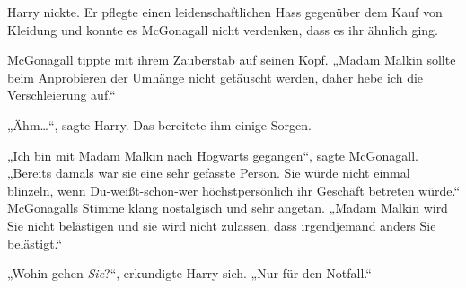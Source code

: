 Harry nickte. Er pflegte einen leidenschaftlichen Hass gegenüber dem Kauf von Kleidung und konnte es McGonagall nicht verdenken, dass es ihr ähnlich ging.

McGonagall tippte mit ihrem Zauberstab auf seinen Kopf. „Madam Malkin sollte beim Anprobieren der Umhänge nicht getäuscht werden, daher hebe ich die Verschleierung auf.“

„Ähm…“, sagte Harry. Das bereitete ihm einige Sorgen.

„Ich bin mit Madam Malkin nach Hogwarts gegangen“, sagte McGonagall. „Bereits damals war sie eine sehr gefasste Person. Sie würde nicht einmal blinzeln, wenn Du-weißt-schon-wer höchstpersönlich ihr Geschäft betreten würde.“ McGonagalls Stimme klang nostalgisch und sehr angetan. „Madam Malkin wird Sie nicht belästigen und sie wird nicht zulassen, dass irgendjemand anders Sie belästigt.“

„Wohin gehen \emph{Sie}?“, erkundigte Harry sich. „Nur für den Notfall.“

